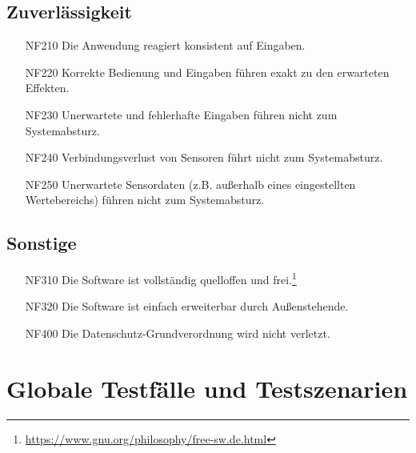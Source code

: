 \documentclass[parskip=full]{scrartcl}
\begin{document}
\subsection{Zuverlässigkeit}

\begin{itemize}

\item[NF210] Die Anwendung reagiert konsistent auf Eingaben.
\item[NF220] Korrekte Bedienung und Eingaben führen exakt zu den erwarteten Effekten.
\item[NF230] Unerwartete und fehlerhafte Eingaben führen nicht zum Systemabsturz.
\item[NF240] Verbindungsverlust von Sensoren führt nicht zum Systemabsturz.
\item[NF250] Unerwartete Sensordaten (z.B. außerhalb eines eingestellten Wertebereichs) führen nicht zum Systemabsturz.

\end{itemize}

\subsection{Sonstige}

\begin{itemize}

\item[NF310] Die Software ist vollständig quelloffen und frei.\footnote{\url{https://www.gnu.org/philosophy/free-sw.de.html}}
\item[NF320] Die Software ist einfach erweiterbar durch Außenstehende.
\item[NF400] Die Datenschutz-Grundverordnung wird nicht verletzt.

\end{itemize}

\section{Globale Testfälle und Testszenarien}\label{testfall}
\end{document}
